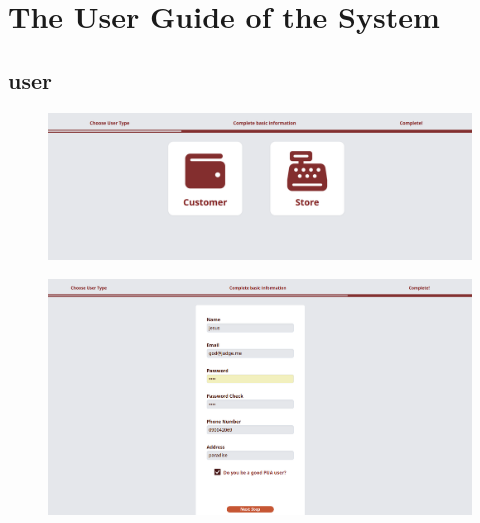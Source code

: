 \documentclass[a4paper, 12pt]{article}
\begin{document}
\section{The User Guide of the System}

\subsection{user}

\begin{figure}[hp]
    \centerline{\includegraphics[width=40em]{gui-snapshot/user/register-customer-1.png}}
    \label{fig:enter-label}
\end{figure}
\begin{figure}[hp]
    \centerline{\includegraphics[width=40em]{gui-snapshot/user/register-customer-2.png}}
    \label{fig:enter-label}
\end{figure}
\newpage
\end{document}
